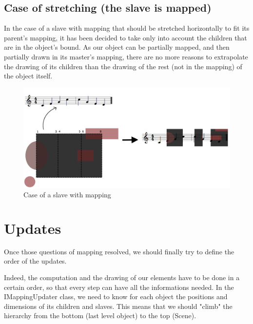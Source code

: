 \documentclass[a4paper]{article}
\begin{document}
\subsection{Case of stretching (the slave is mapped)}\label{subsec:complexMap}

In the case of a slave with mapping that should be stretched horizontally to fit its parent's mapping, it has been decided to take only into account the children that are in the object's bound.
As our object can be partially mapped, and then partially drawn in its master's mapping, there are no more reasons to extrapolate the drawing of its children than the drawing of the rest (not in the mapping) of the object itself.

\begin{figure}[h]
\begin{center}
\includegraphics[width=15cm]{img/withStretchTotal.png}
\caption{Case of a slave with mapping}
\label{fig:mapping}
\end{center}
\end{figure}

\section{Updates}\label{sec:updates}

Once those questions of mapping resolved, we should finally try to define the order of the updates.

Indeed, the computation and the drawing of our elements have to be done in a certain order, so that every step can have all the informations needed. In the IMappingUpdater class, we need to know for each object the positions and dimensions of its children and slaves. This means that we should "climb" the hierarchy from the bottom (last level object) to the top (Scene).
\end{document}
